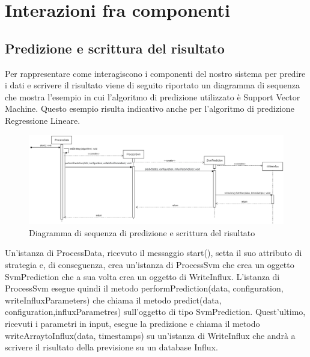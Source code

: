 \section{Interazioni fra componenti}
	\subsection{Predizione e scrittura del risultato}
	Per rappresentare come interagiscono i componenti del nostro sistema per predire i dati e scrivere il risultato viene di seguito riportato un diagramma di sequenza che mostra l'esempio in cui l'algoritmo di predizione utilizzato è Support Vector Machine. Questo esempio risulta indicativo anche per l'algoritmo di predizione Regressione Lineare.  
	\mbox{}
	\begin{landscape}
		\begin{figure} [H]
			\includegraphics[width=\linewidth]{./img/Diagrammi/ds1.png}
			\caption{Diagramma di sequenza di predizione e scrittura del risultato}
		\end{figure}
	\end{landscape}
	Un'istanza di ProcessData, ricevuto il messaggio start(), setta il suo attributo di strategia e, di conseguenza, crea un'istanza di ProcessSvm che crea un oggetto SvmPrediction che a sua volta crea un oggetto di WriteInflux.
	L'istanza di ProcessSvm esegue quindi il metodo performPrediction(data, configuration, writeInfluxParameters) che chiama il metodo predict(data, configuration,influxParametres) sull'oggetto di tipo SvmPrediction. Quest'ultimo, ricevuti i parametri in input, esegue la predizione e chiama il metodo writeArraytoInflux(data, timestamps) su un'istanza di WriteInflux che andrà a scrivere il risultato della previsione su un database Influx.
	
